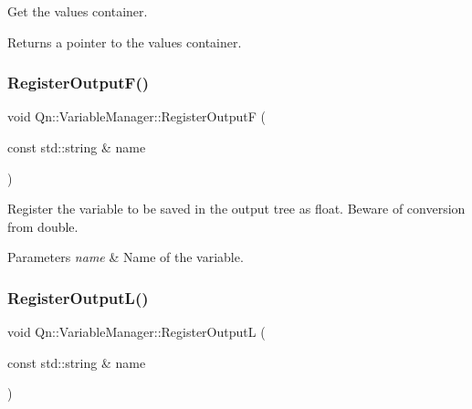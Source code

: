 Get the values container. 

\begin{DoxyReturn}{Returns}
a pointer to the values container. 
\end{DoxyReturn}
\mbox{\label{classQn_1_1VariableManager_a818bd066ddc4cff8372311714a6a7bc5}} 
\subsubsection{\texorpdfstring{Register\+Output\+F()}{RegisterOutputF()}}
{\footnotesize\ttfamily void Qn\+::\+Variable\+Manager\+::\+Register\+OutputF (\begin{DoxyParamCaption}\item[{const std\+::string \&}]{name }\end{DoxyParamCaption})\hspace{0.3cm}{\ttfamily [inline]}}



Register the variable to be saved in the output tree as float. Beware of conversion from double. 


\begin{DoxyParams}{Parameters}
{\em name} & Name of the variable. \\
\hline
\end{DoxyParams}
\mbox{\label{classQn_1_1VariableManager_a27695a4281a76e566ef0d0203520980e}} 
\subsubsection{\texorpdfstring{Register\+Output\+L()}{RegisterOutputL()}}
{\footnotesize\ttfamily void Qn\+::\+Variable\+Manager\+::\+Register\+OutputL (\begin{DoxyParamCaption}\item[{const std\+::string \&}]{name }\end{DoxyParamCaption})\hspace{0.3cm}{\ttfamily [inline]}}




